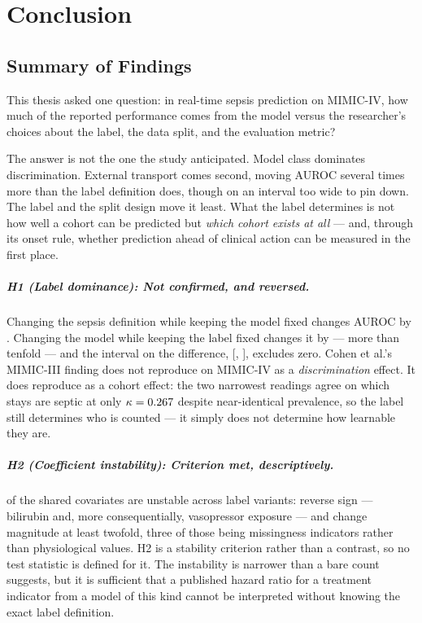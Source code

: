 \chapter{Conclusion}
\label{ch:conclusion}


\section{Summary of Findings}

This thesis asked one question: in real-time sepsis prediction on MIMIC-IV, how
much of the reported performance comes from the model versus the researcher's
choices about the label, the data split, and the evaluation metric?

The answer is not the one the study anticipated. Model class dominates
discrimination. External transport comes second, moving AUROC several times
more than the label definition does, though on an interval too wide to pin
down. The label and the split design move it least. What the label determines is
not how well a cohort can be predicted but \emph{which cohort exists at all} ---
and, through its onset rule, whether prediction ahead of clinical action can be
measured in the first place.

\paragraph{H1 (Label dominance): Not confirmed, and reversed.}
Changing the sepsis definition while keeping the model fixed changes AUROC by
\pcSpreadLabel. Changing the model while keeping the label fixed changes it by
\pcSpreadModelClass{} --- more than tenfold --- and the interval on the
difference, [\pcHOneCiLo, \pcHOneCiHi], excludes zero. Cohen et al.'s
\cite{cohen2024subtle} MIMIC-III finding does not reproduce on MIMIC-IV as a
\emph{discrimination} effect. It does reproduce as a cohort effect: the two
narrowest readings agree on which stays are septic at only
$\kappa = 0.267$ despite near-identical prevalence, so the label still
determines who is counted --- it simply does not determine how learnable they
are.

\paragraph{H2 (Coefficient instability): Criterion met, descriptively.}
\pcHTwoEst{} of the \pcHTwoNTerms{} shared covariates are unstable across label
variants: \pcHTwoNSign{} reverse sign --- bilirubin and, more consequentially,
vasopressor exposure --- and \pcHTwoNMag{} change magnitude at least twofold,
three of those being missingness indicators rather than physiological values.
H2 is a stability criterion rather than a contrast, so no test statistic is
defined for it. The instability is narrower than a bare count suggests, but it
is sufficient that a published hazard ratio for a treatment indicator from a
model of this kind cannot be interpreted without knowing the exact label
definition.

